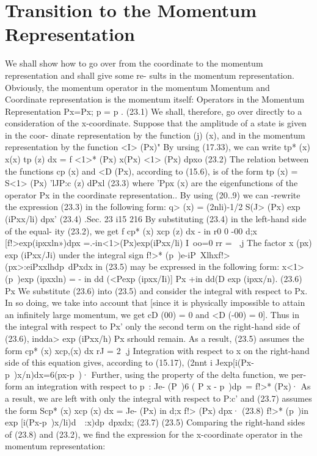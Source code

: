 \documentclass[a4paper,sfsidenotes,colorlinks=true]{tufte-book}
\numberwithin{equation}{section}
\numberwithin{figure}{section}
\begin{document}
{{{{\section{Transition to the Momentum Representation}
We shall show how to go over from the coordinate to the momentum representation and shall give some re- sults in the momentum representation.
Obviously, the momentum operator in the momentum
Momentum and Coordinate
representation is the momentum itself:	Operators in the Momentum Representation
Px=Px;	p = p .	(23.1)
We shall, therefore, go over directly to a consideration of the x-coordinate. Suppose that the amplitude of a state is given in the coor- dinate representation by the function (j) (x), and in the momentum representation by the function <I> (Px)" By ursing (17.33), we can write
tp* (x) x(x) tp (z) dx = f
<1>* (Px) x(Px) <1> (Px) dpxo	(23.2) The relation between the functions cp (x) and <D (Px),
according to (15.6), is of the form tp (x) = S<1> (Px) 'lJP:c (z) dPxl	(23.3)
where 'Ppx (x) are the eigenfunctions of the operator Px in the coordinate representation.. By using (20..9) we can
-rewrite the expression (23.3) in the following form: q> (x) = (2nli)-1/2 S(J> (Px) exp (iPxx/li) dpx'	(23.4)
.Sec. 23
i15
216
By substituting (23.4) in the left-hand side of the equal- ity (23.2), we get
f
cp* (x) xcp (z) dx
- in
r0 0 -00
d;x [f!>exp(ipxxln»)dpx =.-in<1>(Px)exp(iPxx/li) I~oo=0
rr
= ~,j The factor x (px) exp (iPxx/Ji) under the integral sign
f!>* (p~)e-iP~Xlhxf!>(px>:eiPxxlhdp~dPxdx in (23.5) may be expressed in the following form:
x<1>(p~)exp (ipxxln) = - in dd (<Pexp (ipxx/Ii)] Px
+in dd(D	exp (ipxx/n).	(23.6) Px
We substitute (23.6) into (23.5) and consider the integral with respect to Px. In so doing, we take into account that
[since it is physically impossible to attain an infinitely large momentum, we get cD (00) = 0 and <D (-00) = 0]. Thus in the integral with respect to Px' only the second
term on the right-hand side of (23.6), indda> exp (iPxx/h) Px
srhould remain. As a result, (23.5) assumes the form cp* (x) xcp,(x) dx
rJ
= 2~,j Integration with respect to x on the right-hand side of
this equation gives, according to (15.17), (2nnt i	Jexp[i(Px-p~)x/n)dx=6(px-p~)·
Further, using the property of the delta function, we per- form an integration with respect to p~:
Je- (P~)6 ( P x - p~)dp~= f!>* (Px)· As a result, we are left with only the integral with respect
to P:c' and (23.7) assumes the form Scp* (x) xcp (x) dx = Je- (Px) in d;x f!> (Px) dpx·	(23.8)
f!>* (p~)in exp [i(Px-p~)x/li)d~~:x)dp~dpxdx; (23.7)
(23.5)
Comparing the right-hand sides of (23.8) and (23.2), we find the expression for the x-coordinate operator in the momentum representation:
}}}}
\end{document}
